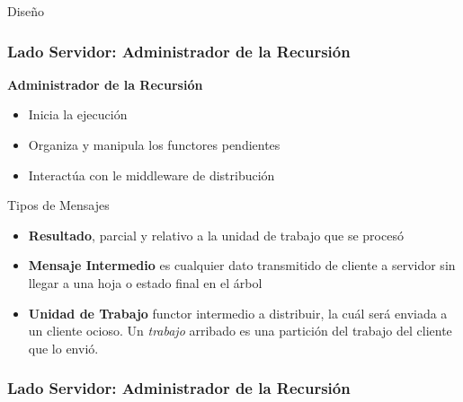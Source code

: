 \begin{subsection}{Diseño}
\begin{frame}
\end{frame}

\begin{frame}\frametitle{Lado Servidor: Administrador de la Recursión}%

    \textbf{Administrador de la Recursión}  

    \begin{itemize}
     \item Inicia la ejecución
     \item Organiza y manipula los functores pendientes
     \item Interactúa con le middleware de distribución
    \end{itemize}

     \begin{block}{Tipos de Mensajes}
        \begin{itemize}
            \item  \textbf{Resultado}, parcial y relativo a la unidad de trabajo que se procesó
            \item  \textbf{Mensaje Intermedio} es cualquier dato transmitido de cliente a servidor sin llegar a una hoja o
                    estado final en el árbol
            \item  \textbf{Unidad de Trabajo} functor intermedio a distribuir, la cuál será enviada a un cliente ocioso. Un \textit{trabajo}
                arribado es una partición del trabajo del cliente que lo envió.
        \end{itemize}
     \end{block}


\end{frame}

\begin{frame}\frametitle{Lado Servidor: Administrador de la Recursión}%


\end{frame}
\end{subsection}
